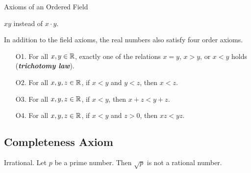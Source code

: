 \documentclass[12pt]{article}
\begin{document}
\begin{definition}{Axioms of an Ordered Field}
\begin{remark}
    $xy$ instead of $x \cdot y$.
  \end{remark}
  In addition to the field axioms, the real numbers also satisfy four order
  axioms.
  \begin{itemize}
  \item [O1. ] For all $x,y \in \mathbb{R}$, exactly one of the relations $x = y$, $x
    > y$, or $x < y$ holds (\textit{\textbf{trichotomy law}}).
  \item [O2. ] For all $x,y,z \in \mathbb{R}$, if $x < y$ and $y < z$, then $x < z$.
  \item [O3. ] For all $x,y,z \in \mathbb{R}$, if $x < y$, then $x + z < y + z$.
  \item [O4. ] For all $x,y,z \in \mathbb{R}$, if $x < y$ and $z > 0$, then $xz <
    yz$.
  \end{itemize}
\end{definition}


\subsection{Completeness Axiom}
\label{sec:org02f2ffe}
\begin{definition}{Irrational.}
  Let $p$ be a prime number. Then $\sqrt{p}$ is not a rational number.
\end{definition}
\end{document}
